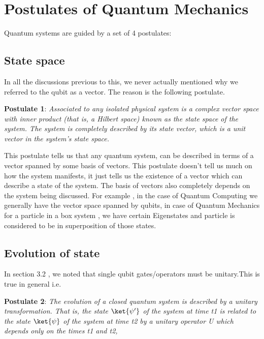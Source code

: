 \section{Postulates of Quantum Mechanics}
Quantum systems are guided by a set of 4 postulates:
\subsection{State space}
In all the discussions previous to this, we never actually mentioned why we referred to the qubit as a vector. The reason is the following postulate.\par

\textbf{Postulate 1}:\emph{ Associated to any isolated physical system is a complex vector space with inner product (that is, a Hilbert space) known as the state space of the system. The system is completely described by its state vector, which is a unit vector in the system’s state space.}\par
This postulate tells us that any quantum system, can be described in terms of a vector spanned by some basis of vectors. This postulate doesn’t tell us much on how the system manifests, it just tells us the existence of a vector which can describe a state of the system.
The basis of vectors also completely depends on the system being discussed. For example , in the case of Quantum Computing we generally have the vector space spanned by qubits, in case of Quantum Mechanics for a particle in a box system , we have certain Eigenstates and particle is considered to be in superposition of those states.
\subsection{Evolution of state}
In section 3.2 , we noted that single qubit gates/operators must be unitary.This is true in general i.e.
 
\par

\textbf{Postulate 2}: \textit{The evolution of a closed quantum system is described by a unitary transformation. That is, the state $\ket{\psi'}$ of the system at time t1 is related to the state $\ket{\psi}$ of the system at time t2 by a unitary operator U which depends only on the times t1 and t2,}

